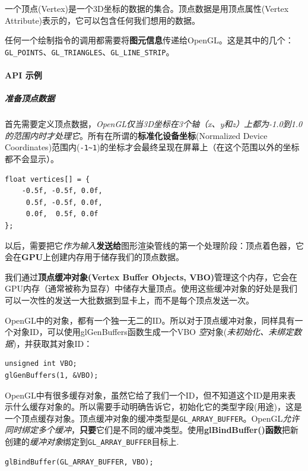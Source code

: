 \documentclass[UTF8,a4paper,12pt]{ctexbook}
\begin{document}
				一个顶点(Vertex)是一个3D坐标的数据的集合。顶点数据是用顶点属性(Vertex Attribute)表示的，它可以包含任何我们想用的数据。
				
				任何一个绘制指令的调用都需要将\textbf{图元信息}传递给OpenGL。这是其中的几个：\verb|GL_POINTS|、\verb|GL_TRIANGLES|、\verb|GL_LINE_STRIP|。
				
			\paragraph{API 示例}
			
				\subparagraph{准备顶点数据}
					首先需要定义顶点数据，\textit{OpenGL仅当3D坐标在3个轴（x、y和z）上都为-1.0到1.0的范围内时才处理它}。所有在所谓的\textbf{标准化设备坐标}(Normalized Device Coordinates)范围内(\verb|-1~1|)的坐标才会最终呈现在屏幕上（在这个范围以外的坐标都不会显示）。
					
					\begin{lstlisting}
float vertices[] = {
    -0.5f, -0.5f, 0.0f,
     0.5f, -0.5f, 0.0f,
     0.0f,  0.5f, 0.0f
};				
					\end{lstlisting}
					
					以后，需要把它\textit{作为输入}\textbf{发送给}图形渲染管线的第一个处理阶段：顶点着色器，它会在\textbf{GPU}上创建内存用于储存我们的顶点数据。
					
					我们通过\textbf{顶点缓冲对象(Vertex Buffer Objects, VBO)}管理这个内存，它会在GPU内存（通常被称为显存）中储存大量顶点。使用这些缓冲对象的好处是我们可以一次性的发送一大批数据到显卡上，而不是每个顶点发送一次。
					
					OpenGL中的对象，都有一个独一无二的ID。所以对于顶点缓冲对象，同样具有一个对象ID，可以使用glGenBuffers函数生成一个VBO \textit{空}对象(\textit{未初始化、未绑定数据})，并获取其对象ID：
					
					\begin{lstlisting}
unsigned int VBO;
glGenBuffers(1, &VBO);				
					\end{lstlisting}
					
					OpenGL中有很多缓存对象，虽然它给了我们一个ID，但不知道这个ID是用来表示什么缓存对象的。所以需要手动明确告诉它，初始化它的类型字段(用途)，这是一个顶点缓存对象。顶点缓冲对象的缓冲类型是\verb|GL_ARRAY_BUFFER|。OpenGL\textit{允许同时绑定多个缓冲}，\textbf{只要}它们是不同的缓冲类型。使用\textbf{glBindBuffer()函数}把新创建的\textit{缓冲对象}绑定到\verb|GL_ARRAY_BUFFER|目标上.
					
					\begin{lstlisting}
glBindBuffer(GL_ARRAY_BUFFER, VBO);
					\end{lstlisting}
					
\end{document}
